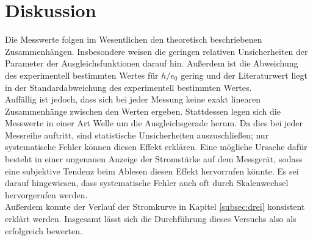 \section{Diskussion}
\label{sec:Diskussion}
Die Messwerte folgen im Wesentlichen den theoretisch beschriebenen Zusammenhängen.
Insbesondere weisen die geringen relativen Unsicherheiten der Parameter der Ausgleichsfunktionen
darauf hin. Außerdem ist die Abweichung des experimentell bestimmten Wertes für
$h/e_{0}$ gering und der Literaturwert liegt in der Standardabweichung des experimentell
bestimmten Wertes. \\
Auffällig ist jedoch, dass sich bei jeder Messung keine exakt linearen Zusammenhänge
zwischen den Werten ergeben. Stattdessen legen sich die Messwerte in einer Art Welle
um die Ausgleichsgerade herum. Da dies bei jeder Messreihe auftritt, sind statistische
Unsicherheiten auszuschließen; nur systematische Fehler können diesen Effekt erklären.
Eine mögliche Ursache dafür besteht in einer ungenauen Anzeige der Stromstärke auf dem Messgerät, sodass
eine subjektive Tendenz beim Ablesen diesen Effekt hervorrufen könnte. Es sei darauf
hingewiesen, dass systematische Fehler auch oft durch Skalenwechsel hervorgerufen werden.\\
Außerdem konnte der Verlauf der Stromkurve in Kapitel \ref{subsec:drei} konsistent erklärt werden.
Insgesamt lässt sich die Durchführung dieses Versuchs also als erfolgreich bewerten.
